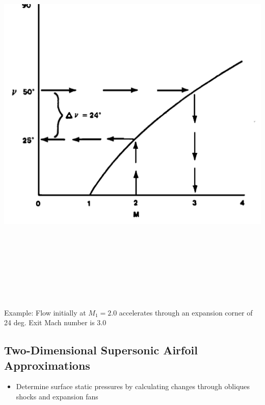 \documentclass[
]{book}
\providecommand{\tightlist}{%
  \setlength{\itemsep}{0pt}\setlength{\parskip}{0pt}}
\begin{document}
\includegraphics[width=8.8in,height=7.5in]{media/05/image66.png}

Example: Flow initially at \(M_1 = 2.0\) accelerates through an expansion corner of 24 deg. Exit Mach number is 3.0

\hypertarget{two-dimensional-supersonic-airfoil-approximations}{%
\subsection{Two-Dimensional Supersonic Airfoil Approximations}\label{two-dimensional-supersonic-airfoil-approximations}}

\begin{itemize}
\tightlist
\item
  Determine surface static pressures by calculating changes through obliques shocks and expansion fans
\end{itemize}
\end{document}

